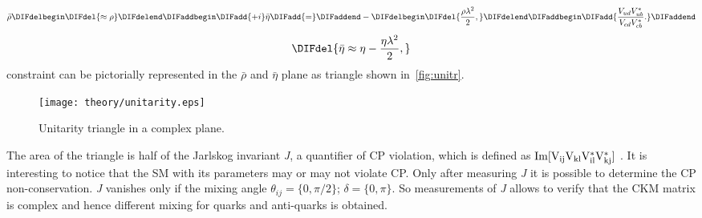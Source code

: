 \DIFaddend \begin{equation}
\bar{\rho} \DIFdelbegin \DIFdel{\approx \rho }\DIFdelend \DIFaddbegin \DIFadd{+ i }\bar{\eta}\DIFadd{= }\DIFaddend -\DIFdelbegin \DIFdel{\frac{\rho\lambda^{2}}{2},
}\DIFdelend \DIFaddbegin \DIFadd{\frac{V_{ud}V^*_{ub}}{V_{cd}V^*_{cb}}.	
}\DIFaddend \end{equation}
\DIFdelbegin \begin{displaymath}
\DIFdel{\bar{\eta} \approx \eta - \frac{\eta\lambda^{2}}{2},
}\end{displaymath}
\DIFdelend \DIFaddbegin {}\DIFaddend constraint can be pictorially represented in the $\bar{\rho}$ and $\bar{\eta}$ plane as \DIFdelbegin {}\DIFdelend \DIFaddbegin {}\DIFaddend triangle shown in~\autoref{fig:unitr}.
\begin{figure}[h]
\centering
\texttt{[image: theory/unitarity.eps]}
\caption{Unitarity triangle in a complex plane.}
\label{fig:unitr}
\end{figure}
The area of the triangle is half of the Jarlskog invariant \textit{J}, a quantifier of CP violation, which is defined as $\rm{Im}[V_{ij}V_{kl}V^*_{il}V^*_{kj}]$ \cite{Jarlskog:1985ht}. It is interesting to notice that the \gls{SM} with its parameters may or may not violate CP. Only after measuring \textit{J} it is possible to determine the CP non-conservation. \textit{J} vanishes only if the mixing angle $\theta_{ij} = \{0 , \pi/2\}$; $\delta = \{0 , \pi\}$. So measurements of \textit{J} allows to verify that the \gls{CKM} matrix is complex and hence different mixing for quarks and anti-quarks is obtained.%

